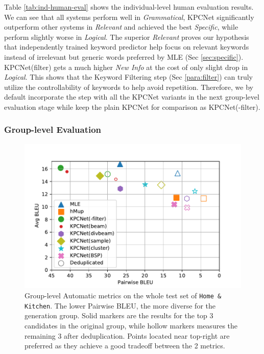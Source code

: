 \documentclass[letterpaper]{article} %
\begin{document}
Table \ref{tab:ind-human-eval} shows the individual-level human evaluation results. We can see that all systems perform well in \textit{Grammatical}, KPCNet significantly outperform other systems in \textit{Relevant} and achieved the best \textit{Specific}, while perform slightly worse in \textit{Logical}. The superior \textit{Relevant} proves our hypothesis that independently trained keyword predictor help focus on relevant keywords instead of irrelevant but generic words preferred by MLE (Sec \ref{sec:specific}). KPCNet(filter) gets a much higher \textit{New Info} at the cost of only slight drop in \textit{Logical}. This shows that the Keyword Filtering step (Sec \ref{para:filter}) can truly utilize the controllability of keywords to help avoid repetition. Therefore, we by default incorporate the step with all the KPCNet variants in the next group-level evaluation stage while keep the plain KPCNet for comparison as KPCNet(-filter).

\subsubsection{Group-level Evaluation}

  \begin{figure}[htbp]
    \centering
    \includegraphics[width=\linewidth]{tradeoff-2BLEU.pdf}
    \caption{Group-level Automatic metrics on the whole test set of \texttt{Home \& Kitchen}. The lower Pairwise BLEU, the more diverse for the generation group. Solid markers are the results for the top 3 candidates in the original group, while hollow markers measures the remaining 3 after deduplication. Points located near top-right are preferred as they achieve a good tradeoff between the 2 metrics.}
    \label{fig:group-filter}
    \end{figure}
\end{document}
